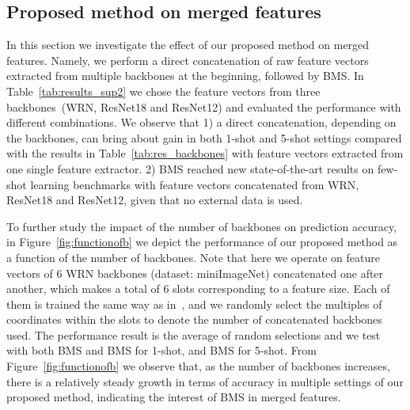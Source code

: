 \documentclass[review]{elsarticle}
\begin{document}
\subsection{Proposed method on merged features}
In this section we investigate the effect of our proposed method on merged features. Namely, we perform a direct concatenation of raw feature vectors extracted from multiple backbones at the beginning, followed by BMS. In Table~\ref{tab:results_sup2} we chose the feature vectors from three backbones~(WRN, ResNet18 and ResNet12) and evaluated the performance with different combinations. We observe that 1) a direct concatenation, depending on the backbones, can bring about  gain in both 1-shot and 5-shot settings compared with the results in Table~\ref{tab:res_backbones} with feature vectors extracted from one single feature extractor. 2) BMS reached new state-of-the-art results on few-shot learning benchmarks with feature vectors concatenated from WRN, ResNet18 and ResNet12, given that no external data is used. 

To further study the impact of the number of backbones on prediction accuracy, in Figure~\ref{fig:functionofb} we depict the performance of our proposed method as a function of the number of backbones. Note that here we operate on feature vectors of 6 WRN backbones (dataset: miniImageNet) concatenated one after another, which makes a total of 6 slots corresponding to a  feature size. Each of them is trained the same way as in~\cite{mangla2020charting}, and we randomly select the multiples of  coordinates within the slots to denote the number of concatenated backbones used. The performance result is the average of  random selections and we test with both BMS and BMS for 1-shot, and BMS for 5-shot. From Figure~\ref{fig:functionofb} we observe that, as the number of backbones increases, there is a relatively steady growth in terms of accuracy in multiple settings of our proposed method, indicating the interest of BMS in merged features.  
\end{document}
